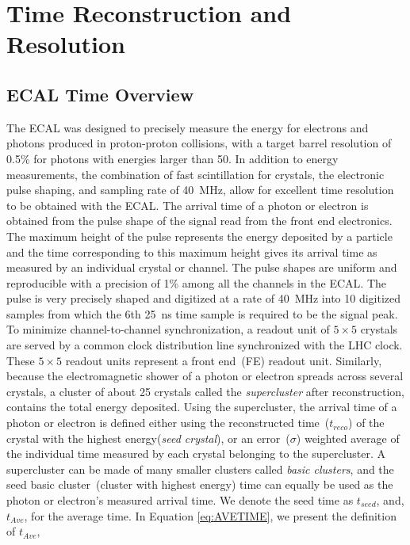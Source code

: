 \chapter{Time Reconstruction and Resolution}
\section*{ECAL Time Overview}
The ECAL was designed to precisely measure the energy for electrons and photons produced in proton-proton collisions, with a target barrel resolution of 0.5\% for photons with energies larger than 50\GeV. In addition to energy measurements, the combination of fast scintillation for \pb crystals, the electronic pulse shaping, and sampling rate of 40~MHz, allow for excellent time resolution to be obtained with the ECAL. The arrival time of a photon or electron is obtained from the pulse shape of the signal read from the front end electronics. The maximum height of the pulse represents the energy deposited by a particle and the time corresponding to this maximum height gives its arrival time as measured by an individual crystal or channel. The pulse shapes are uniform and reproducible with a precision of 1\% among all the channels in the ECAL. The pulse is very precisely shaped and digitized at a rate of 40~MHz into 10 digitized samples from
which the 6th 25~ns time sample is required to be the signal peak. 
To minimize channel-to-channel synchronization, a readout unit of $5\times5$ crystals are served by a common clock distribution line synchronized with the LHC clock.
These $5\times5$ readout units represent a front end~(FE) readout unit. Similarly, because the
electromagnetic shower of a photon or electron spreads across several crystals, a cluster of about 25 crystals called the \textit{supercluster} after reconstruction, contains the total energy deposited.
Using the supercluster, the arrival time of a photon or electron is defined either using the reconstructed time~($ t_{reco}$) of the crystal with the highest energy(\textit{seed crystal}), or an error~($\sigma$) weighted average of the individual time measured by each crystal belonging to the supercluster. A supercluster can be made of many smaller clusters called \textit{basic clusters}, and the seed basic cluster~(cluster with highest energy) time can equally be used as the photon or electron's measured arrival time. We denote the seed time as $t_{seed}$, and, $t_{Ave}$, for the average time. In Equation \ref{eq:AVETIME}, we present the definition of $t_{Ave}$,


